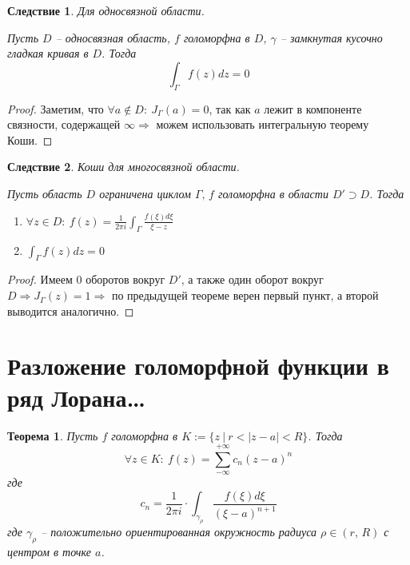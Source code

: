\documentclass[a4paper,12pt]{article}
\theoremstyle{plain}
\newtheorem{theorem}{Теорема}[section]
\newtheorem*{corollary}{Следствие}
\theoremstyle{definition}
\theoremstyle{remark}
\begin{document}
\begin{corollary}
	Для односвязной области.

	Пусть $D$ -- односвязная область, $f$ голоморфна в $D$, $\gamma$ -- замкнутая кусочно гладкая кривая в $D$. Тогда
	\[
		\int_\Gamma f(z)dz = 0
	\]
\end{corollary}

\begin{proof}
	Заметим, что $\forall a \not\in D :\: J_\Gamma(a) = 0$, так как $a$ лежит в компоненте связности, содержащей $\infty \Rightarrow$ можем использовать интегральную теорему Коши.
\end{proof}

\begin{corollary}
	Коши для многосвязной области.

	Пусть область $D$ ограничена циклом $\Gamma,\, f$ голоморфна в области $D' \supset D$. Тогда
	\begin{enumerate}
		\item $\forall z \in D :\: f(z) = \frac{1}{2\pi i}\int_\Gamma\frac{f(\xi)d\xi}{\xi - z}$
		\item $\int_\Gamma f(z)dz = 0$
	\end{enumerate}
\end{corollary}

\begin{proof}
	Имеем $0$ оборотов вокруг $D'$, а также один оборот вокруг $D \Rightarrow J_\Gamma(z) = 1 \Rightarrow$ по предыдущей теореме верен первый пункт, а второй выводится аналогично.
\end{proof}

\section{Разложение голоморфной функции в ряд Лорана\dots}
\begin{theorem}
	Пусть $f$ голоморфна в $K := \{z \:\vert\: r < \vert z - a\vert < R\}$. Тогда
	\[
		\forall z \in K :\: f(z) = \sum_{-\infty}^{+\infty}c_n(z - a)^n
	\]
	где
	\[
		c_n = \frac{1}{2\pi i}\cdot\int_{\gamma_\rho}\frac{f(\xi)d\xi}{(\xi - a)^{n + 1}}
	\]
	где $\gamma_\rho$ -- положительно ориентированная окружность радиуса $\rho \in (r,\, R)$ с центром в точке $a$.
\end{theorem}
\end{document}
